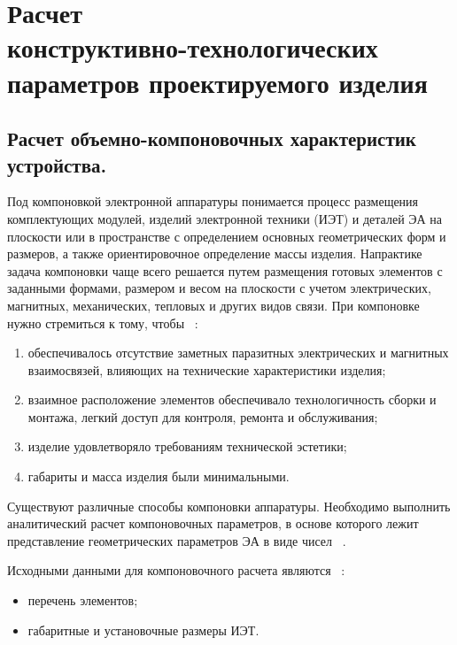 
\section{Расчет \\
  конструктивно-технологических \\
  параметров проектируемого изделия}

\subsection{Расчет объемно-компоновочных характеристик устройства.}

Под компоновкой электронной аппаратуры понимается процесс размещения
комплектующих модулей, изделий электронной техники (ИЭТ) и деталей ЭА
на плоскости или в пространстве с определением основных геометрических
форм и размеров, а также ориентировочное определение массы изделия.
Напрактике задача компоновки чаще всего решается путем размещения
готовых элементов с заданными формами, размером и весом на плоскости с
учетом электрических, магнитных, механических, тепловых и других видов
связи. При компоновке нужно стремиться к тому, чтобы ~\cite{Kostukevich2012}:
\begin{enumerate}
\item обеспечивалось отсутствие заметных паразитных электрических и магнитных взаимосвязей,
  влияющих на технические характеристики изделия;
  
\item взаимное расположение элементов обеспечивало технологичность сборки и монтажа,
  легкий доступ для контроля, ремонта и обслуживания;
  
\item изделие удовлетворяло требованиям технической эстетики;
\item габариты и масса изделия были минимальными.
\end{enumerate}

Существуют различные способы компоновки аппаратуры.
Необходимо выполнить аналитический расчет компоновочных параметров,
в основе которого лежит представление геометрических параметров ЭА
в виде чисел ~\cite{Kostukevich2012}.

Исходными данными для компоновочного расчета являются
~\cite{Kostukevich2012}:
\begin{itemize}
\item перечень элементов;  
\item габаритные и установочные размеры ИЭТ.
\end{itemize}

